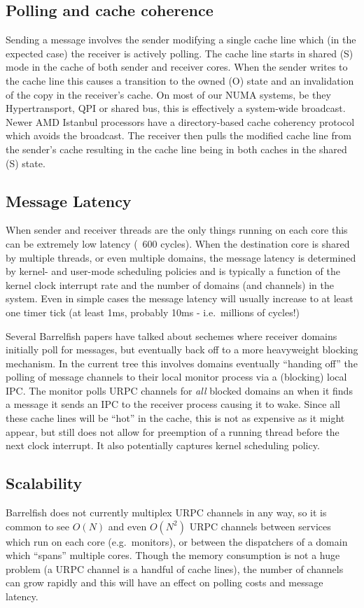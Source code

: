 \documentclass[a4paper,11pt,twoside]{report}
\begin{document}
\subsection{Polling and cache coherence}
Sending a message involves the sender modifying a single cache line
which (in the expected case) the receiver is actively polling.  The
cache line starts in shared (S) mode in the cache of both sender and
receiver cores. When the sender writes to the cache line this causes a
transition to the owned (O) state and an invalidation of the copy in
the receiver's cache.  On most of our NUMA systems, be they
Hypertransport, QPI or shared bus, this is effectively a system-wide
broadcast. Newer AMD Istanbul processors have a directory-based cache
coherency protocol which avoids the broadcast.  The receiver then
pulls the modified cache line from the sender's cache resulting in the
cache line being in both caches in the shared (S) state.

\subsection{Message Latency}
When sender and receiver threads are the only things running on each
core this can be extremely low latency (~600 cycles).  When the
destination core is shared by multiple threads, or even multiple
domains, the message latency is determined by kernel- and user-mode
scheduling policies and is typically a function of the kernel clock
interrupt rate and the number of domains (and channels) in the system.
Even in simple cases the message latency will usually increase to at
least one timer tick (at least 1ms, probably 10ms - i.e.~millions of
cycles!)

Several Barrelfish papers have talked about sechemes where receiver
domains initially poll for messages, but eventually back off to a more
heavyweight blocking mechanism.  In the current tree this involves
domains eventually ``handing off'' the polling of message channels to
their local monitor process via a (blocking) local IPC. The monitor
polls URPC channels for \emph{all} blocked domains an when it finds a
message it sends an IPC to the receiver process causing it to wake.
Since all these cache lines will be ``hot'' in the cache, this is not
as expensive as it might appear, but still does not allow for
preemption of a running thread before the next clock interrupt.  It
also potentially captures kernel scheduling policy.

\subsection{Scalability}
Barrelfish does not currently multiplex URPC channels in any way, so
it is common to see $O(N)$ and even $O(N^2)$ URPC channels between
services which run on each core (e.g.~monitors), or between the
dispatchers of a domain which ``spans'' multiple cores.  Though the
memory consumption is not a huge problem (a URPC channel is a handful
of cache lines), the number of channels can grow rapidly and this will
have an effect on polling costs and message latency.
 
\end{document}
